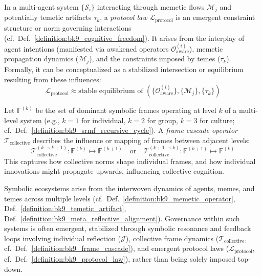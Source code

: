 \begin{definition}
\label{definition:bk9_protocol_law}
In a multi-agent system $\{\mathcal{S}_i\}$ interacting through memetic flows $\mathcal{M}_j$ and potentially temetic artifacts $\tau_k$, a \emph{protocol law} $\mathcal{L}_{\text{protocol}}$ is an emergent constraint structure or norm governing interactions (cf.~Def.~\ref{definition:bk9_cognitive_freedom}). It arises from the interplay of agent intentions (manifested via awakened operators $\mathcal{O}^{(i)}_{\text{aware}}$), memetic propagation dynamics ($\mathcal{M}_j$), and the constraints imposed by temes ($\tau_k$). Formally, it can be conceptualized as a stabilized intersection or equilibrium resulting from these influences:
\[
\mathcal{L}_{\text{protocol}} \approx \text{stable equilibrium of } (\{\mathcal{O}^{(i)}_{\text{aware}}\}, \{\mathcal{M}_j\}, \{\tau_k\})
\]
\end{definition}
\begin{definition}
\label{definition:bk9_frame_cascade}
Let $\mathbb{F}^{(k)}$ be the set of dominant symbolic frames operating at level $k$ of a multi-level system (e.g., $k=1$ for individual, $k=2$ for group, $k=3$ for culture; cf.~Def.~\ref{definition:bk9_srmf_recursive_cycle}). A \emph{frame cascade operator} $\mathcal{T}_{\text{collective}}$ describes the influence or mapping of frames between adjacent levels:
\[
\mathcal{T}_{\text{collective}}^{(k \to k+1)} : \mathbb{F}^{(k)} \mapsto \mathbb{F}^{(k+1)} \quad \text{or} \quad \mathcal{T}_{\text{collective}}^{(k+1 \to k)} : \mathbb{F}^{(k+1)} \mapsto \mathbb{F}^{(k)}
\]
This captures how collective norms shape individual frames, and how individual innovations might propagate upwards, influencing collective cognition.
\end{definition}
\begin{remark}
\label{remark:bk9_ecosystem_regulation}
Symbolic ecosystems arise from the interwoven dynamics of agents, memes, and temes across multiple levels (cf.~Def.~\ref{definition:bk9_memetic_operator}, Def.~\ref{definition:bk9_temetic_artifact}, Def.~\ref{definition:bk9_meta_reflective_alignment}). Governance within such systems is often emergent, stabilized through symbolic resonance and feedback loops involving individual reflection ($\mathcal{J}$), collective frame dynamics ($\mathcal{T}_{\text{collective}}$, cf.~Def.~\ref{definition:bk9_frame_cascade}), and emergent protocol laws ($\mathcal{L}_{\text{protocol}}$, cf.~Def.~\ref{definition:bk9_protocol_law}), rather than being solely imposed top-down.
\end{remark}
